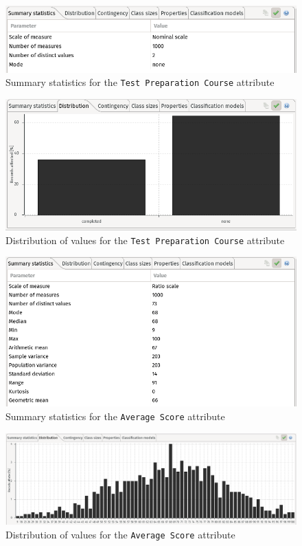 \documentclass[a4paper, 11pt]{article}
\begin{document}
\begin{figure}[H]
    \centering
    \includegraphics[width=.9\textwidth]{img/test-preparation.png}
    \caption{Summary statistics for the \texttt{Test Preparation Course} 
attribute}
\end{figure}

\begin{figure}[H]
    \centering
    \includegraphics[width=.9\textwidth]{img/course-distr.png}
    \caption{Distribution of values for the \texttt{Test Preparation Course} 
attribute}
\end{figure}

\begin{figure}[H]
    \centering
    \includegraphics[width=.9\textwidth]{img/score.png}
    \caption{Summary statistics for the \texttt{Average Score} attribute}
\end{figure}

\vspace{6\baselineskip}

\begin{figure}[H]
    \centering
    \includegraphics[width=\textwidth]{img/score-distr.png}
    \caption{Distribution of values for the \texttt{Average Score} attribute}
    \label{fig:score-distr}
\end{figure}
\end{document}
